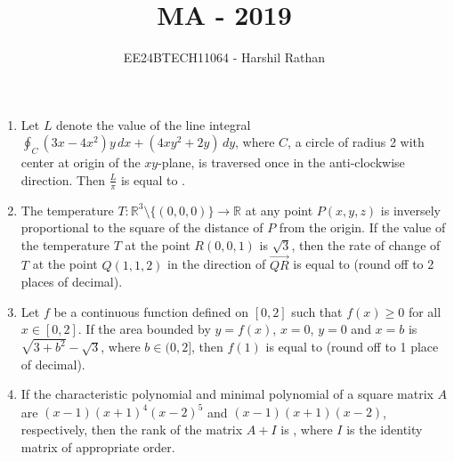 \documentclass[journal]{IEEEtran}
\begin{document}

\vspace{3cm}

\title{MA - 2019}
\author{EE24BTECH11064 - Harshil Rathan}
\maketitle

\renewcommand{\thefigure}{\theenumi}
\renewcommand{\thetable}{\theenumi}

\begin{enumerate}
\item Let \( L \) denote the value of the line integral \( \oint_C (3x - 4x^2)y \, dx + (4xy^2 + 2y) \, dy \), where \( C \), a circle of radius 2 with center at origin of the \( xy \)-plane, is traversed once in the anti-clockwise direction. Then \( \frac{L}{\pi} \) is equal to \underline{\hspace{1cm}}.

\vspace{0.5cm}
\item The temperature \( T : \mathbb{R}^3 \setminus \{(0,0,0)\} \to \mathbb{R} \) at any point \( P(x, y, z) \) is inversely proportional to the square of the distance of \( P \) from the origin. If the value of the temperature \( T \) at the point \( R(0,0,1) \) is \( \sqrt{3} \), then the rate of change of \( T \) at the point \( Q(1,1,2) \) in the direction of \( \overrightarrow{QR} \) is equal to \underline{\hspace{1cm}} (round off to 2 places of decimal).

\vspace{0.5cm}
\item Let \( f \) be a continuous function defined on \( [0, 2] \) such that \( f(x) \geq 0 \) for all \( x \in [0, 2] \). If the area bounded by \( y = f(x) \), \( x = 0 \), \( y = 0 \) and \( x = b \) is \( \sqrt{3 + b^2} - \sqrt{3} \), where \( b \in (0, 2] \), then \( f(1) \) is equal to \underline{\hspace{1cm}} (round off to 1 place of decimal).

\vspace{0.5cm}
\item If the characteristic polynomial and minimal polynomial of a square matrix \( A \) are \( (x - 1)(x + 1)^4(x - 2)^5 \) and \( (x - 1)(x + 1)(x - 2) \), respectively, then the rank of the matrix \( A + I \) is \underline{\hspace{1cm}}, where \( I \) is the identity matrix of appropriate order.


\end{enumerate}
\end{document}
